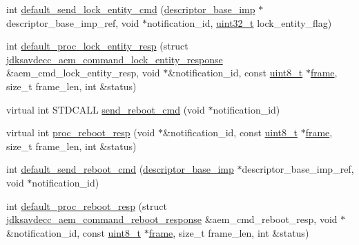\begin{DoxyCompactItemize}
\item 
int \hyperlink{classavdecc__lib_1_1descriptor__base__imp_af40ac09b84feb7551bf0389a2a5db4ca}{default\+\_\+send\+\_\+lock\+\_\+entity\+\_\+cmd} (\hyperlink{classavdecc__lib_1_1descriptor__base__imp}{descriptor\+\_\+base\+\_\+imp} $\ast$descriptor\+\_\+base\+\_\+imp\+\_\+ref, void $\ast$notification\+\_\+id, \hyperlink{parse_8c_a6eb1e68cc391dd753bc8ce896dbb8315}{uint32\+\_\+t} lock\+\_\+entity\+\_\+flag)
\item 
int \hyperlink{classavdecc__lib_1_1descriptor__base__imp_a3b3582020613e7f60efe96567679be7f}{default\+\_\+proc\+\_\+lock\+\_\+entity\+\_\+resp} (struct \hyperlink{structjdksavdecc__aem__command__lock__entity__response}{jdksavdecc\+\_\+aem\+\_\+command\+\_\+lock\+\_\+entity\+\_\+response} \&aem\+\_\+cmd\+\_\+lock\+\_\+entity\+\_\+resp, void $\ast$\&notification\+\_\+id, const \hyperlink{stdint_8h_aba7bc1797add20fe3efdf37ced1182c5}{uint8\+\_\+t} $\ast$\hyperlink{gst__avb__playbin_8c_ac8e710e0b5e994c0545d75d69868c6f0}{frame}, size\+\_\+t frame\+\_\+len, int \&status)
\item 
virtual int S\+T\+D\+C\+A\+LL \hyperlink{classavdecc__lib_1_1descriptor__base__imp_a7579db44e8e86da0f8f94aa4680df795}{send\+\_\+reboot\+\_\+cmd} (void $\ast$notification\+\_\+id)
\item 
virtual int \hyperlink{classavdecc__lib_1_1descriptor__base__imp_a8b3de398748e8299daf7296964f73c22}{proc\+\_\+reboot\+\_\+resp} (void $\ast$\&notification\+\_\+id, const \hyperlink{stdint_8h_aba7bc1797add20fe3efdf37ced1182c5}{uint8\+\_\+t} $\ast$\hyperlink{gst__avb__playbin_8c_ac8e710e0b5e994c0545d75d69868c6f0}{frame}, size\+\_\+t frame\+\_\+len, int \&status)
\item 
int \hyperlink{classavdecc__lib_1_1descriptor__base__imp_a14e3bd11c70e839a0594dc59dffcbf16}{default\+\_\+send\+\_\+reboot\+\_\+cmd} (\hyperlink{classavdecc__lib_1_1descriptor__base__imp}{descriptor\+\_\+base\+\_\+imp} $\ast$descriptor\+\_\+base\+\_\+imp\+\_\+ref, void $\ast$notification\+\_\+id)
\item 
int \hyperlink{classavdecc__lib_1_1descriptor__base__imp_a774dc940e9918a60127b0b021582b32a}{default\+\_\+proc\+\_\+reboot\+\_\+resp} (struct \hyperlink{structjdksavdecc__aem__command__reboot__response}{jdksavdecc\+\_\+aem\+\_\+command\+\_\+reboot\+\_\+response} \&aem\+\_\+cmd\+\_\+reboot\+\_\+resp, void $\ast$\&notification\+\_\+id, const \hyperlink{stdint_8h_aba7bc1797add20fe3efdf37ced1182c5}{uint8\+\_\+t} $\ast$\hyperlink{gst__avb__playbin_8c_ac8e710e0b5e994c0545d75d69868c6f0}{frame}, size\+\_\+t frame\+\_\+len, int \&status)

\end{DoxyCompactItemize}
